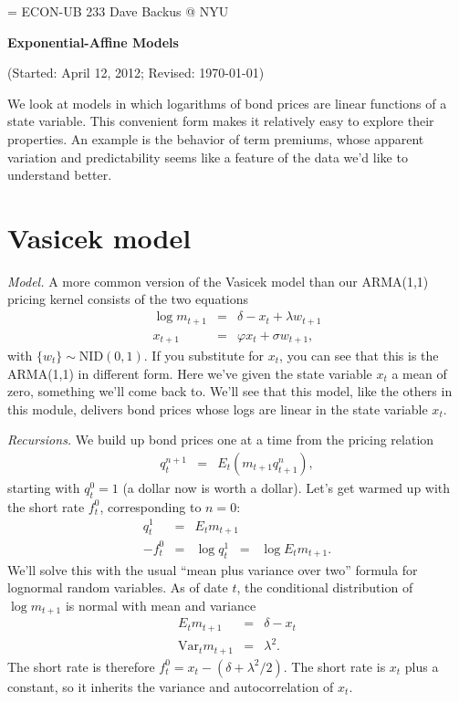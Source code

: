 \documentclass[11pt]{article}
\begin{document}
\parskip=\bigskipamount
\parindent=0.0in
\thispagestyle{empty}
{\large ECON-UB 233 \hfill Dave Backus @ NYU}

\bigskip\bigskip
\centerline{\Large \bf Exponential-Affine Models}
\centerline{(Started: April 12, 2012; Revised: \today)}

\bigskip
We look at models in which logarithms of bond
prices are linear functions of a state variable.
This convenient form makes it relatively easy to explore their
properties.
An example is the behavior of term premiums,
whose apparent variation  and predictability
seems like a feature of the data we'd like to understand better.


\section{Vasicek model}


{\it Model.\/}
A more common version of the Vasicek model than our ARMA(1,1) pricing kernel
consists of the two equations
\begin{eqnarray*}
    \log m_{t+1} &=& \delta - x_t + \lambda w_{t+1} \\
         x_{t+1} &=& \varphi x_t + \sigma w_{t+1} ,
\end{eqnarray*}
with $\{ w_t \} \sim \mbox{NID}(0,1)$.
If you substitute for $x_t$, you can see that this is the ARMA(1,1)
in different form.
Here we've given the state variable $x_t$ a mean of zero,
something we'll come back to.
We'll see that this model, like the others in this module,
delivers bond prices whose logs are linear in the state variable $x_t$.



{\it Recursions.\/}
We build up bond prices one at a time from
the pricing relation
\begin{eqnarray*}
    q^{n+1}_t &=& E_t \left( m_{t+1} q^n_{t+1} \right) ,
\end{eqnarray*}
starting with $q^0_t = 1$ (a dollar now is worth a dollar).
Let's get warmed up with the short rate $f^0_t$, corresponding
to $n=0$:
\begin{eqnarray*}
    q^1_t   &=&  E_t m_{t+1} \\
    - f^0_t &=&  \log q^1_{t} \;\;=\;\; \log E_t m_{t+1} .
\end{eqnarray*}
We'll solve this with the usual ``mean plus variance over two''
formula for lognormal random variables.
As of date $t$,
the conditional distribution of $\log m_{t+1}$ is
normal with mean and variance
\begin{eqnarray*}
    E_t m_{t+1} &=& \delta - x_t \\
    \mbox{Var}_t m_{t+1} &=& \lambda^2 .
\end{eqnarray*}
The short rate is therefore
$ f^0_t = x_t - (\delta + \lambda^2/2)$.
The short rate is $x_t$ plus a constant,
so it inherits the variance and autocorrelation of $x_t$.
\end{document}
